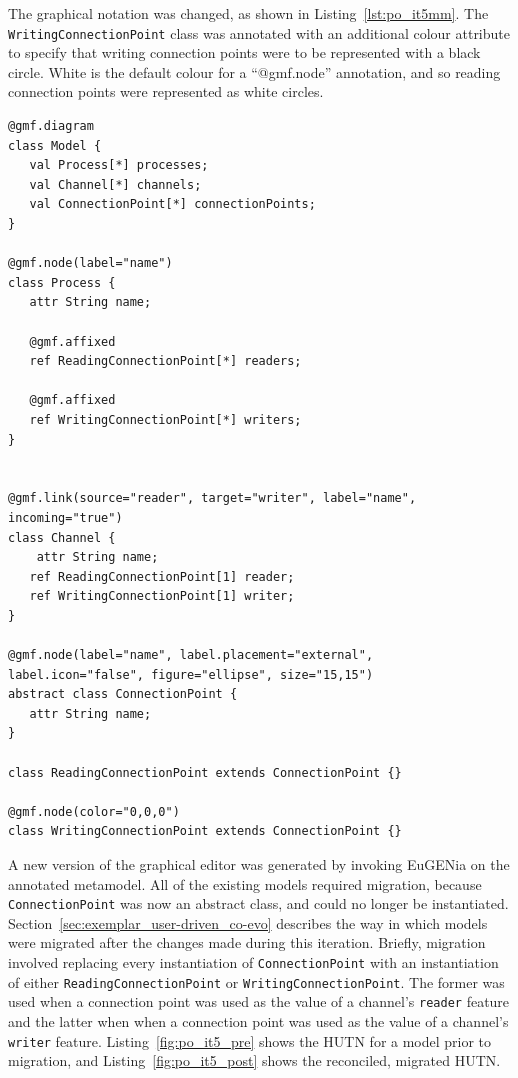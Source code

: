 The graphical notation was changed, as shown in Listing~\ref{lst:po_it5mm}. The \texttt{Wr\-i\-ti\-ngCo\-nn\-ec\-ti\-o\-nP\-oi\-nt} class was annotated with an additional colour attribute to specify that writing connection points were to be represented with a black circle. White is the default colour for a ``@gmf.node'' annotation, and so reading connection points were represented as white circles.

\begin{lstlisting}[caption=The annotated process-oriented metamodel after the fifth iteration, label=lst:po_it5_mm, language=Emfatic]
@gmf.diagram
class Model {
   val Process[*] processes;
   val Channel[*] channels;
   val ConnectionPoint[*] connectionPoints;
}

@gmf.node(label="name")
class Process {
   attr String name;
      
   @gmf.affixed
   ref ReadingConnectionPoint[*] readers;
   
   @gmf.affixed
   ref WritingConnectionPoint[*] writers; 
}


@gmf.link(source="reader", target="writer", label="name", incoming="true")
class Channel { 
	attr String name;
   ref ReadingConnectionPoint[1] reader;
   ref WritingConnectionPoint[1] writer;
}

@gmf.node(label="name", label.placement="external", label.icon="false", figure="ellipse", size="15,15")
abstract class ConnectionPoint {
   attr String name;
}

class ReadingConnectionPoint extends ConnectionPoint {}

@gmf.node(color="0,0,0")
class WritingConnectionPoint extends ConnectionPoint {}
\end{lstlisting}

A new version of the graphical editor was generated by invoking EuGENia on the annotated metamodel. All of the existing models required migration, because \texttt{Co\-nn\-ec\-ti\-o\-nP\-oi\-nt} was now an abstract class, and could no longer be instantiated. Section~\ref{sec:exemplar_user-driven_co-evo} describes the way in which models were migrated after the changes made during this iteration. Briefly, migration involved replacing every instantiation of \texttt{Co\-nn\-ec\-ti\-o\-nP\-oi\-nt} with an instantiation of either \texttt{Re\-a\-di\-ngCo\-nn\-ec\-ti\-o\-nP\-oi\-nt} or \texttt{Wr\-i\-ti\-ngCo\-nn\-ec\-ti\-o\-nP\-oi\-nt}. The former was used when a connection point was used as the value of a channel's \texttt{re\-ad\-er} feature and the latter when  when a connection point was used as the value of a channel's \texttt{wr\-it\-er} feature. Listing~\ref{fig:po_it5_pre} shows the HUTN for a model prior to migration, and Listing~\ref{fig:po_it5_post} shows the reconciled, migrated HUTN.

